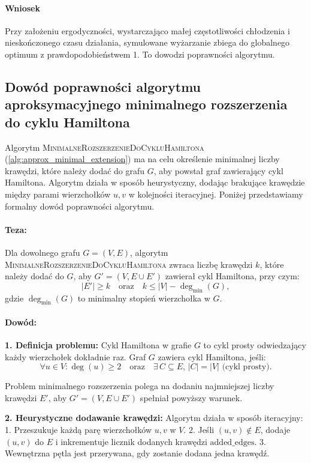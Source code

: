 \paragraph{Wniosek}
Przy założeniu ergodyczności, wystarczająco małej częstotliwości chłodzenia i nieskończonego czasu działania, symulowane wyżarzanie zbiega do globalnego optimum z prawdopodobieństwem 1. To dowodzi poprawności algorytmu.

\subsection{Dowód poprawności algorytmu aproksymacyjnego minimalnego rozszerzenia do cyklu Hamiltona}

Algorytm \textsc{MinimalneRozszerzenieDoCykluHamiltona} (\ref{alg:approx_minimal_extension}) ma na celu określenie minimalnej liczby krawędzi, które należy dodać do grafu \( G \), aby powstał graf zawierający cykl Hamiltona. Algorytm działa w sposób heurystyczny, dodając brakujące krawędzie między parami wierzchołków \( u, v \) w kolejności iteracyjnej. Poniżej przedstawiamy formalny dowód poprawności algorytmu.

\paragraph{Teza:}
Dla dowolnego grafu \( G = (V, E) \), algorytm \textsc{MinimalneRozszerzenieDoCykluHamiltona} zwraca liczbę krawędzi \( k \), które należy dodać do \( G \), aby \( G' = (V, E \cup E') \) zawierał cykl Hamiltona, przy czym:
\[
|E'| \geq k \quad \text{oraz} \quad k \leq |V| - \deg_{\text{min}}(G),
\]
gdzie \( \deg_{\text{min}}(G) \) to minimalny stopień wierzchołka w \( G \).

\paragraph{Dowód:}

\textbf{1. Definicja problemu:}
Cykl Hamiltona w grafie \( G \) to cykl prosty odwiedzający każdy wierzchołek dokładnie raz. Graf \( G \) zawiera cykl Hamiltona, jeśli:
\[
\forall u \in V: \deg(u) \geq 2 \quad \text{oraz} \quad \exists \, C \subseteq E, \, |C| = |V| \text{ (cykl prosty)}.
\]

Problem minimalnego rozszerzenia polega na dodaniu najmniejszej liczby krawędzi \( E' \), aby \( G' = (V, E \cup E') \) spełniał powyższy warunek.

\textbf{2. Heurystyczne dodawanie krawędzi:}
Algorytm działa w sposób iteracyjny:
1. Przeszukuje każdą parę wierzchołków \( u, v \) w \( V \).
2. Jeśli \( (u, v) \notin E \), dodaje \( (u, v) \) do \( E \) i inkrementuje licznik dodanych krawędzi \( \text{added\_edges} \).
3. Wewnętrzna pętla jest przerywana, gdy zostanie dodana jedna krawędź.

